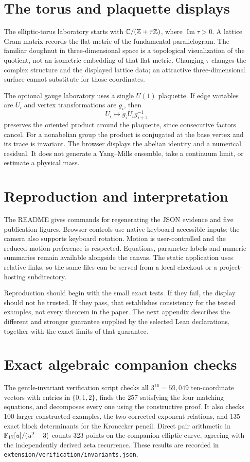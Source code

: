 \section{The torus and plaquette displays}

The elliptic-torus laboratory starts with $\mathbb{C}/(\mathbb{Z}+\tau\mathbb{Z})$, where
$\operatorname{Im}\tau>0$. A lattice Gram matrix records the flat metric of
the fundamental parallelogram. The familiar doughnut in three-dimensional
space is a topological visualization of the quotient, not an isometric
embedding of that flat metric. Changing $\tau$ changes the complex structure
and the displayed lattice data; an attractive three-dimensional surface
cannot substitute for those coordinates.

The optional gauge laboratory uses a single $U(1)$ plaquette. If edge
variables are $U_i$ and vertex transformations are $g_i$, then
\[
 U_i\longmapsto g_iU_ig_{i+1}^{-1}
\]
preserves the oriented product around the plaquette, since consecutive
factors cancel. For a nonabelian group the product is conjugated at the
base vertex and its trace is invariant. The browser displays the abelian
identity and a numerical residual. It does not generate a Yang--Mills
ensemble, take a continuum limit, or estimate a physical mass.

\section{Reproduction and interpretation}

The README gives commands for regenerating the JSON evidence and five
publication figures. Browser controls use native keyboard-accessible inputs;
the camera also supports keyboard rotation. Motion is user-controlled and
the reduced-motion preference is respected. Equations, parameter labels and
numeric summaries remain available alongside the canvas. The static
application uses relative links, so the same files can be served from a
local checkout or a project-hosting subdirectory.

Reproduction should begin with the small exact tests. If they fail, the
display should not be trusted. If they pass, that establishes consistency
for the tested examples, not every theorem in the paper. The next appendix
describes the different and stronger guarantee supplied by the selected
Lean declarations, together with the exact limits of that guarantee.

\section{Exact algebraic companion checks}
The gentle-invariant verification script checks all \(3^{10}=59{,}049\) ten-coordinate vectors with entries in \(\{0,1,2\}\), finds the 257 satisfying the four matching equations, and decomposes every one using the constructive proof. It also checks 100 larger constructed examples, the two corrected exponent relations, and 135 exact block determinants for the Kronecker pencil. Direct pair arithmetic in \(\mathbb{F}_{17}[u]/(u^2-3)\) counts 323 points on the companion elliptic curve, agreeing with the independently derived zeta recurrence. These results are recorded in \texttt{extension/verification/invariants.json}.

